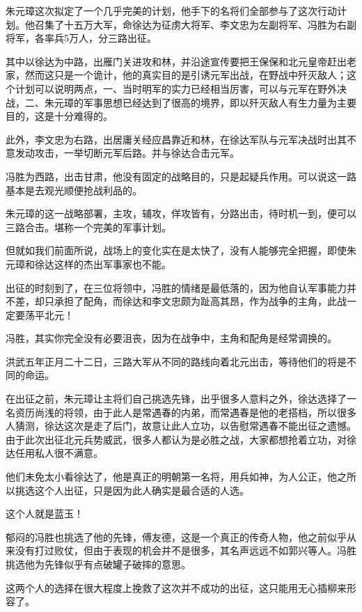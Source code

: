	\begin{multicols}{\theparacolNo}
		\fi
		朱元璋这次拟定了一个几乎完美的计划，他手下的名将们全部参与了这次行动计划。他召集了十五万大军，命徐达为征虏大将军、李文忠为左副将军、冯胜为右副将军，各率兵5万人，分三路出征。

		其中以徐达为中路，出雁门关进攻和林，并沿途宣传要把王保保和北元皇帝赶出老家，然而这只是一个诡计，他的真实目的是引诱元军出战，在野战中歼灭敌人；这个计划可以说明两点，一、当时明军的实力已经相当厉害，可以与元军在野外决战，二、朱元璋的军事思想已经达到了很高的境界，即以歼灭敌人有生力量为主要目的，这是十分难得的。

		此外，李文忠为右路，出居庸关经应昌靠近和林，在徐达军队与元军决战时出其不意发动攻击，一举切断元军后路。并与徐达合击元军。

		冯胜为西路，出击甘肃，他没有固定的战略目的，只是起疑兵作用。可以说这一路基本是去观光顺便抢战利品的。

		朱元璋的这一战略部署，主攻，辅攻，佯攻皆有，分路出击，待时机一到，便可以三路合击。堪称一个完美的军事计划。

		但就如我们前面所说，战场上的变化实在是太快了，没有人能够完全把握，即使朱元璋和徐达这样的杰出军事家也不能。

		出征的时刻到了，在三位将领中，冯胜的情绪是最低落的，因为他自认军事能力并不差，却只承担了配角，而徐达和李文忠颇为趾高其昂，作为战争的主角，此战一定要荡平北元！

		冯胜，其实你完全没有必要沮丧，因为在战争中，主角和配角是经常调换的。

		洪武五年正月二十二日，三路大军从不同的路线向着北元出击，等待他们的将是不同的命运。

		在出征之前，朱元璋让主将们自己挑选先锋，出乎很多人意料之外，徐达选择了一名资历尚浅的将领，由于此人是常遇春的内弟，而常遇春是他的老搭档，所以很多人猜测，徐达这次是走了后门，故意让此人立功，以告慰常遇春不能出征之遗憾。由于此次出征北元兵势威武，很多人都认为是必胜之战，大家都想抢着立功，对徐达任用私人很不满意。

		他们未免太小看徐达了，他是真正的明朝第一名将，用兵如神，为人公正，他之所以挑选这个人出征，只是因为此人确实是最合适的人选。

		这个人就是蓝玉！

		郁闷的冯胜也挑选了他的先锋，傅友德，这是一个真正的传奇人物，他之前似乎从来没有打过败仗，但由于表现的机会并不是很多，其名声远远不如郭兴等人。冯胜挑选他为先锋似乎有点破罐子破摔的意思。

		这两个人的选择在很大程度上挽救了这次并不成功的出征，这只能用无心插柳来形容了。


\end{multicols}
